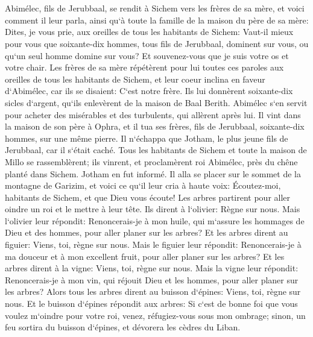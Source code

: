 \chapter{}

\verse Abimélec, fils de Jerubbaal, se rendit à Sichem vers les frères de sa mère, et voici comment il leur parla, ainsi qu`à toute la famille de la maison du père de sa mère: 
\verse Dites, je vous prie, aux oreilles de tous les habitants de Sichem: Vaut-il mieux pour vous que soixante-dix hommes, tous fils de Jerubbaal, dominent sur vous, ou qu`un seul homme domine sur vous? Et souvenez-vous que je suis votre os et votre chair. 
\verse Les frères de sa mère répétèrent pour lui toutes ces paroles aux oreilles de tous les habitants de Sichem, et leur coeur inclina en faveur d`Abimélec, car ils se disaient: C`est notre frère. 
\verse Ils lui donnèrent soixante-dix sicles d`argent, qu`ils enlevèrent de la maison de Baal Berith. Abimélec s`en servit pour acheter des misérables et des turbulents, qui allèrent après lui. 
\verse Il vint dans la maison de son père à Ophra, et il tua ses frères, fils de Jerubbaal, soixante-dix hommes, sur une même pierre. Il n`échappa que Jotham, le plus jeune fils de Jerubbaal, car il s`était caché. 
\verse Tous les habitants de Sichem et toute la maison de Millo se rassemblèrent; ils vinrent, et proclamèrent roi Abimélec, près du chêne planté dans Sichem. 
\verse Jotham en fut informé. Il alla se placer sur le sommet de la montagne de Garizim, et voici ce qu`il leur cria à haute voix: Écoutez-moi, habitants de Sichem, et que Dieu vous écoute! 
\verse Les arbres partirent pour aller oindre un roi et le mettre à leur tête. Ils dirent à l`olivier: Règne sur nous. 
\verse Mais l`olivier leur répondit: Renoncerais-je à mon huile, qui m`assure les hommages de Dieu et des hommes, pour aller planer sur les arbres? 
\verse Et les arbres dirent au figuier: Viens, toi, règne sur nous. 
\verse Mais le figuier leur répondit: Renoncerais-je à ma douceur et à mon excellent fruit, pour aller planer sur les arbres? 
\verse Et les arbres dirent à la vigne: Viens, toi, règne sur nous. 
\verse Mais la vigne leur répondit: Renoncerais-je à mon vin, qui réjouit Dieu et les hommes, pour aller planer sur les arbres? 
\verse Alors tous les arbres dirent au buisson d`épines: Viens, toi, règne sur nous. 
\verse Et le buisson d`épines répondit aux arbres: Si c`est de bonne foi que vous voulez m`oindre pour votre roi, venez, réfugiez-vous sous mon ombrage; sinon, un feu sortira du buisson d`épines, et dévorera les cèdres du Liban. 
